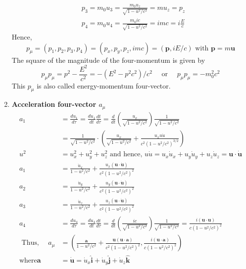 \begin{enumerate}
\begin{align*}
		&p_{3}=m_{0} u_{3}=\frac{m_{0} u_{z}}{\sqrt{1-u^{2} / c^{2}}}=m u_{z}=p_{z} \\
		&p_{4}=m_{0} u_{4}=\frac{m_{0} i c}{\sqrt{1-u^{2} / c^{2}}}=i m c=i \frac{E}{c}
	\end{align*}
	Hence,
	$$
	p_{\mu}=\left(p_{1}, p_{2}, p_{3}, p_{4}\right)=\left(p_{x}, p_{y}, p_{z}, i m c\right)=(\mathbf{p}, i E / c) \text { with } \mathbf{p}=m \mathbf{u}
	$$
	The square of the magnitude of the four-momentum is given by
	$$
	p_{\mu} p_{\mu}=p^{2}-\frac{E^{2}}{c^{2}}=-\left(E^{2}-p^{2} c^{2}\right) / c^{2} \quad \text { or } \quad p_{\mu} p_{\mu}=-m_{0}^{2} c^{2}
	$$
	This $p_{\mu}$ is also called energy-momentum four-vector.
	\item \textbf{ Acceleration four-vector $a_{\mu}$}\\
	\begin{align*}
	a_{1}&=\frac{d u_{1}}{d \tau}=\frac{d u_{1}}{d t} \frac{d t}{d \tau}=\frac{d}{d t}\left(\frac{u_{x}}{\sqrt{1-u^{2} / c^{2}}}\right) \frac{1}{\sqrt{1-u^{2} / c^{2}}}\\
	&=\frac{1}{\sqrt{1-u^{2} / c^{2}}} \cdot\left(\frac{u_{x}}{\sqrt{1-u^{2} / c^{2}}}+\frac{u_{x} u \dot{u}}{c^{2}\left(1-u^{2} / c^{2}\right)^{3 / 2}}\right)\\
	u^{2}&=u_{x}^{2}+u_{y}^{2}+u_{z}^{2} \text { and hence, } u \dot{u}=u_{x} \dot{u}_{x}+u_{y} \dot{u}_{y}+u_{z} \dot{u}_{z}=\mathbf{u} \cdot \dot{\mathbf{u}}\\
	a_{1}&=\frac{\dot{u}_{x}}{1-u^{2} / c^{2}}+\frac{u_{x}(\mathbf{u} \cdot \dot{\mathbf{u}})}{c^{2}\left(1-u^{2} / c^{2}\right)^{2}}\\
	a_{2}&=\frac{\dot{u}_{y}}{1-u^{2} / c^{2}}+\frac{u_{y}(\mathbf{u} \cdot \dot{\mathbf{u}})}{c^{2}\left(1-u^{2} / c^{2}\right)^{2}}\\
	a_{3}&=\frac{\dot{u}_{z}}{1-u^{2} / c^{2}}+\frac{u_{z}(\mathbf{u} \cdot \dot{\mathbf{u}})}{c^{2}\left(1-u^{2} / c^{2}\right)^{2}}\\
	a_{4}&=\frac{d u_{4}}{d \tau}=\frac{d u_{4}}{d t} \frac{d t}{d \tau}=\frac{d}{d t}\left(\frac{i c}{\sqrt{1-u^{2} / c^{2}}}\right) \frac{1}{\sqrt{1-u^{2} / c^{2}}}=\frac{i(\mathbf{u} \cdot \mathbf{u})}{c\left(1-u^{2} / c^{2}\right)^{2}}\\
	\text { Thus, } \quad a_{\mu}&=\left(\frac{\mathbf{a}}{1-u^{2} / c^{2}}+\frac{\mathbf{u}(\mathbf{u} \cdot \mathbf{a})}{c^{2}\left(1-u^{2} / c^{2}\right)^{2}}, \frac{i(\mathbf{u} \cdot \mathbf{a})}{c\left(1-u^{2} / c^{2}\right)^{2}}\right)\\
\text{where} \mathbf{a}&=\dot{\mathbf{u}}=\dot{u}_{x} \hat{\mathbf{i}}+\dot{u}_{y} \hat{\mathbf{j}}+\dot{u}_{z} \hat{\mathbf{k}}

\end{align*}
\end{enumerate}
